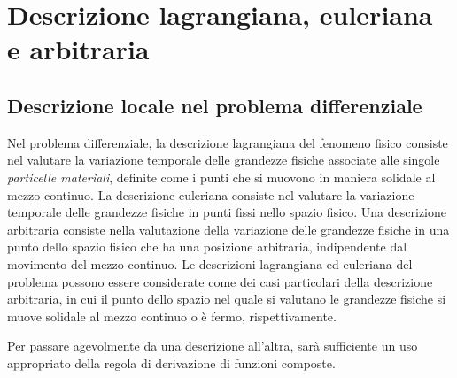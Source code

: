 
\section{Descrizione lagrangiana, euleriana e arbitraria}

\subsection{Descrizione locale nel problema differenziale}
Nel problema differenziale, la descrizione lagrangiana del fenomeno fisico consiste nel valutare la variazione temporale delle grandezze fisiche associate alle singole \textit{particelle materiali}, definite come i punti che si muovono in maniera solidale al mezzo continuo. La descrizione euleriana consiste nel valutare la variazione temporale delle grandezze fisiche in punti fissi nello spazio fisico. Una descrizione arbitraria consiste nella valutazione della variazione delle grandezze fisiche in una punto dello spazio fisico che ha una posizione arbitraria, indipendente dal movimento del mezzo continuo. Le descrizioni lagrangiana ed euleriana del problema possono essere considerate come dei casi particolari della descrizione arbitraria, in cui il punto dello spazio nel quale si valutano le grandezze fisiche si muove solidale al mezzo continuo o è fermo, rispettivamente.

Per passare agevolmente da una descrizione all'altra, sarà sufficiente un uso appropriato della regola di derivazione di funzioni composte.


